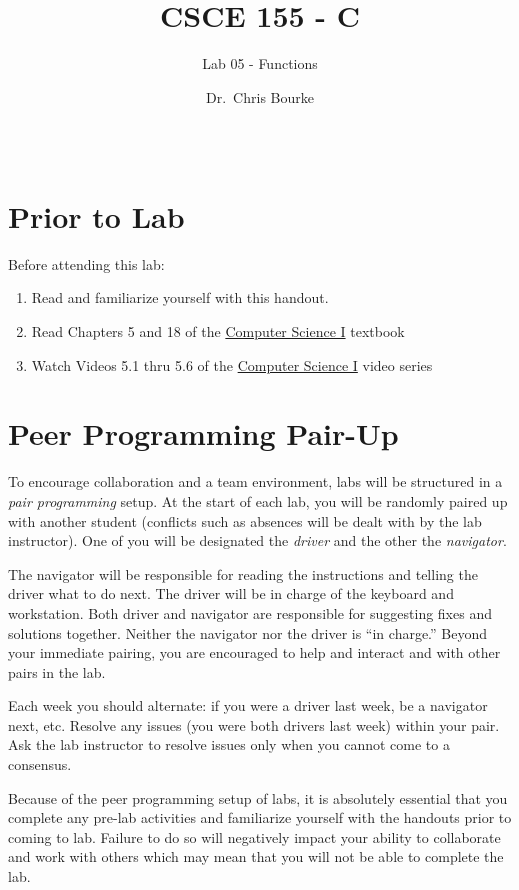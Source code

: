 \documentclass[12pt]{scrartcl}
\title{CSCE 155 - C}
\subtitle{Lab 05 - Functions}
\author{Dr.\ Chris Bourke}
\date{~}
\begin{document}
\maketitle

\section*{Prior to Lab}

Before attending this lab:
\begin{enumerate}
  \item Read and familiarize yourself with this handout.
  \item Read Chapters 5 and 18 of the \href{http://cse.unl.edu/~cbourke/ComputerScienceOne.pdf}{Computer Science I} textbook
  \item Watch Videos 5.1 thru 5.6 of the \href{https://www.youtube.com/playlist?list=PL4IH6CVPpTZVkiEnCEOdGbYsFEdtKc5Bx}{Computer Science I} video series
\end{enumerate}

\section*{Peer Programming Pair-Up}

To encourage collaboration and a team environment, labs will be
structured in a \emph{pair programming} setup.  At the start of
each lab, you will be randomly paired up with another student 
(conflicts such as absences will be dealt with by the lab instructor).
One of you will be designated the \emph{driver} and the other
the \emph{navigator}.  

The navigator will be responsible for reading the instructions and
telling the driver what to do next.  The driver will be in charge of the
keyboard and workstation.  Both driver and navigator are responsible
for suggesting fixes and solutions together.  Neither the navigator
nor the driver is ``in charge.''  Beyond your immediate pairing, you
are encouraged to help and interact and with other pairs in the lab.

Each week you should alternate: if you were a driver last week, 
be a navigator next, etc.  Resolve any issues (you were both drivers
last week) within your pair.  Ask the lab instructor to resolve issues
only when you cannot come to a consensus.  

Because of the peer programming setup of labs, it is absolutely 
essential that you complete any pre-lab activities and familiarize
yourself with the handouts prior to coming to lab.  Failure to do
so will negatively impact your ability to collaborate and work with 
others which may mean that you will not be able to complete the
lab.  
\end{document}
